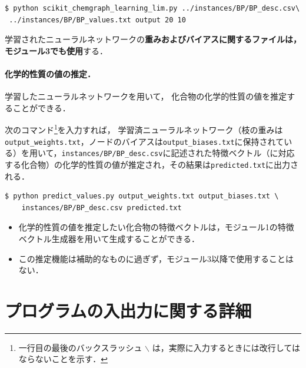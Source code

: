 \documentclass[11pt,titlepage,dvipdfmx,twoside]{jsbook}
\begin{document}
\begin{oframed}
{\small
\begin{verbatim}
$ python scikit_chemgraph_learning_lim.py ../instances/BP/BP_desc.csv\
 ../instances/BP/BP_values.txt output 20 10
\end{verbatim}
}
\end{oframed}

学習されたニューラルネットワークの{\bf 重みおよびバイアスに関するファイルは，モジュール3でも使用}する．


\paragraph{化学的性質の値の推定．}
学習したニューラルネットワークを用いて，
化合物の化学的性質の値を推定することができる．

次のコマンド\footnote{一行目の最後のバックスラッシュ $\backslash$ は，実際に入力するときには改行してはならないことを示す．}を入力すれば，
学習済ニューラルネットワーク（枝の重みは\verb|output_weights.txt|，ノードのバイアスは\verb|output_biases.txt|に保持されている）を用いて，\verb|instances/BP/BP_desc.csv|に記述された特徴ベクトル（に対応する化合物）の化学的性質の値が推定され，その結果は\verb|predicted.txt|に出力される．

\begin{oframed}
  {\small
\begin{verbatim}
$ python predict_values.py output_weights.txt output_biases.txt \
    instances/BP/BP_desc.csv predicted.txt
\end{verbatim}
}
  \end{oframed}

\begin{itemize}
\item 化学的性質の値を推定したい化合物の特徴ベクトルは，モジュール1の特徴ベクトル生成器を用いて生成することができる．
\item この推定機能は補助的なものに過ぎず，モジュール3以降で使用することはない．
\end{itemize}


\section{プログラムの入出力に関する詳細}
\label{chap:2io}
\end{document}

